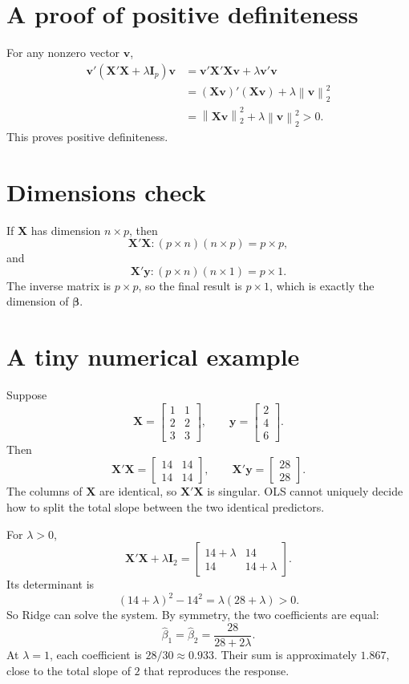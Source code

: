 \documentclass[11pt,a4paper,oneside]{book}
\theoremstyle{remark}
\newcommand{\X}{\mathbf X}
\newcommand{\y}{\mathbf y}
\newcommand{\I}{\mathbf I}
\newcommand{\bta}{\boldsymbol{\beta}}
\newcommand{\norm}[1]{\left\lVert #1\right\rVert_2}
\begin{document}
\section{A proof of positive definiteness}
For any nonzero vector $\mathbf v$,
\[
\begin{aligned}
\mathbf v'(\X'\X+\lambda\I_p)\mathbf v
&=\mathbf v'\X'\X\mathbf v+\lambda\mathbf v'\mathbf v\\
&=(\X\mathbf v)'(\X\mathbf v)+\lambda\norm{\mathbf v}^2\\
&=\norm{\X\mathbf v}^2+\lambda\norm{\mathbf v}^2>0.
\end{aligned}
\]
This proves positive definiteness.

\section{Dimensions check}
If $\X$ has dimension $n\times p$, then
\[
\X'\X:(p\times n)(n\times p)=p\times p,
\]
and
\[
\X'\y:(p\times n)(n\times1)=p\times1.
\]
The inverse matrix is $p\times p$, so the final result is $p\times1$,
which is exactly the dimension of $\bta$.

\section{A tiny numerical example}
Suppose
\[
\X=\begin{bmatrix}1&1\\2&2\\3&3\end{bmatrix},
\qquad
\y=\begin{bmatrix}2\\4\\6\end{bmatrix}.
\]
Then
\[
\X'\X=\begin{bmatrix}14&14\\14&14\end{bmatrix},
\qquad
\X'\y=\begin{bmatrix}28\\28\end{bmatrix}.
\]
The columns of $\X$ are identical, so $\X'\X$ is singular. OLS cannot
uniquely decide how to split the total slope between the two identical
predictors.

For $\lambda>0$,
\[
\X'\X+\lambda\I_2=
\begin{bmatrix}14+\lambda&14\\14&14+\lambda\end{bmatrix}.
\]
Its determinant is
\[
(14+\lambda)^2-14^2=\lambda(28+\lambda)>0.
\]
So Ridge can solve the system. By symmetry, the two coefficients are equal:
\[
\widehat\beta_1=\widehat\beta_2=\frac{28}{28+2\lambda}.
\]
At $\lambda=1$, each coefficient is $28/30\approx0.933$. Their sum is
approximately $1.867$, close to the total slope of $2$ that reproduces
the response.
\end{document}
